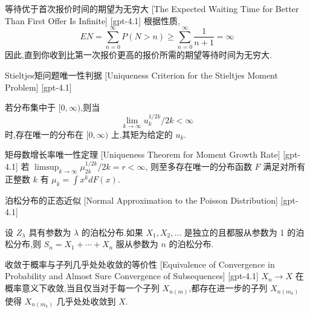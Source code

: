 \documentclass[UTF8]{ctexart}
\begin{document}
    
    
    \begin{thm}
        {等待优于首次报价时间的期望为无穷大}
        [The Expected Waiting Time for Better Than First Offer Is Infinite]
        [gpt-4.1]
        根据性质,
\[
EN = \sum_{n=0}^{\infty} P(N > n) \geq \sum_{n=0}^{\infty} \frac{1}{n+1} = \infty
\]
因此,直到你收到比第一次报价更高的报价所需的期望等待时间为无穷大.
    \end{thm}
    
    
    
    \begin{thm}
        {Stieltjes矩问题唯一性判据}
        [Uniqueness Criterion for the Stieltjes Moment Problem]
        [gpt-4.1]
        
若分布集中于 $[0, \infty)$,则当
\[
\lim_{k \to \infty} 
u_k^{1/2k} / 2k < \infty
\]
时,存在唯一的分布在 $[0, \infty)$ 上,其矩为给定的 $
u_k$.

    \end{thm}
    
    
    
    \begin{thm}
        {矩母数增长率唯一性定理}
        [Uniqueness Theorem for Moment Growth Rate]
        [gpt-4.1]
        若 $\limsup_{k \to \infty} \mu_{2k}^{1 / 2 k} / 2k = r < \infty$, 则至多存在唯一的分布函数 $F$ 满足对所有正整数 $k$ 有 $\mu_k = \int x^k dF(x)$.
    \end{thm}
    
    
    
    \begin{thm}
        {泊松分布的正态近似}
        [Normal Approximation to the Poisson Distribution]
        [gpt-4.1]
        
设 $Z_{\lambda}$ 具有参数为 $\lambda$ 的泊松分布.如果 $X_{1}, X_{2}, \dots$ 是独立的且都服从参数为 1 的泊松分布,则 $S_{n} = X_{1} + \cdots + X_{n}$ 服从参数为 $n$ 的泊松分布.

    \end{thm}
    
    
    
    \begin{thm}
        {收敛于概率与子列几乎处处收敛的等价性}
        [Equivalence of Convergence in Probability and Almost Sure Convergence of Subsequences]
        [gpt-4.1]
        $X_{n} \to X$ 在概率意义下收敛,当且仅当对于每一个子列 $X_{n(m)}$,都存在进一步的子列 $X_{n(m_{k})}$ 使得 $X_{n(m_{k})}$ 几乎处处收敛到 $X$.
    \end{thm}
    
\end{document}
